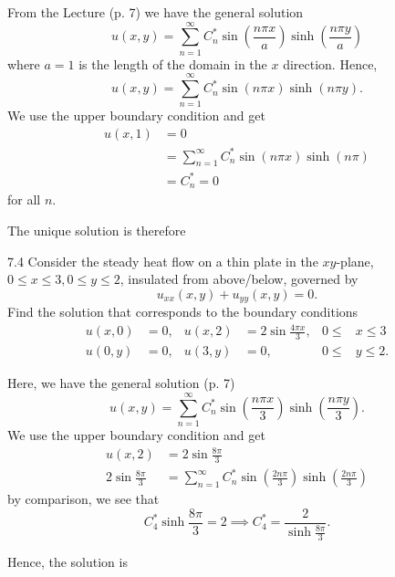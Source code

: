 \begin{derivation}
  From the Lecture (p. 7) we have the general solution
  \begin{equation*}
    u(x,y) = \sum_{n = 1}^{\infty} C_n^{*} \sin \left( \frac{n \pi x}{a} \right) \sinh \left( \frac{n \pi y}{a} \right)
  \end{equation*}
  where $a = 1$ is the length of the domain in the $x$ direction.
  Hence,
  \begin{equation*}
    u(x,y) = \sum_{n = 1}^{\infty} C_n^{*} \sin (n \pi x) \sinh (n \pi y)
  .\end{equation*}
  We use the upper boundary condition and get
  \begin{align*}
    u(x,1) &= 0 \\
    &= \sum_{n = 1}^{\infty} C_n^{*} \sin (n \pi x) \sinh(n \pi) \\
    &= C_n^{*} = 0
  \end{align*}
  for all $n$.

  The unique solution is therefore
\end{derivation}


\begin{problem}{7.4}
  Consider the steady heat flow on a thin plate in the $xy$-plane, $0 \leq x\leq 3, 0 \leq y \leq 2$, insulated from above/below, governed by
  \[ 
  u_{x x} (x,y) + u_{y y}(x,y) = 0 
  .\]
  Find the solution that corresponds to the boundary conditions
  \begin{align*}
    u(x,0) &= 0, & u(x,2) &= 2 \sin \frac{4 \pi x}{3}, & 0 \leq& x \leq 3 \\
    u(0,y) &= 0, & u(3,y) &= 0, & 0 \leq& y \leq 2
  .\end{align*}
\end{problem}

\begin{derivation}
  Here, we have the general solution (p. 7)
  \begin{equation*}
    u(x,y) = \sum_{n = 1}^{\infty} C_n^{*} \sin \left( \frac{n \pi x}{3} \right) \sinh \left( \frac{n \pi y}{3} \right)
  .\end{equation*}
  We use the upper boundary condition and get
  \begin{align*}
    u(x,2) &= 2 \sin \frac{8 \pi}{3} \\
    2 \sin \frac{8 \pi}{3} &= \sum_{n = 1}^{\infty} C_n^{*} \sin \left(\frac{2n \pi}{3} \right) \sinh \left(\frac{2 n \pi}{3} \right)
  \end{align*}
  by comparison, we see that
  \begin{equation*}
    C_4^{*} \sinh \frac{8 \pi}{3} = 2 \implies C_4^{*} = \frac{2}{\sinh \frac{8 \pi}{3}}
  .\end{equation*}
  
  Hence, the solution is
\end{derivation}

